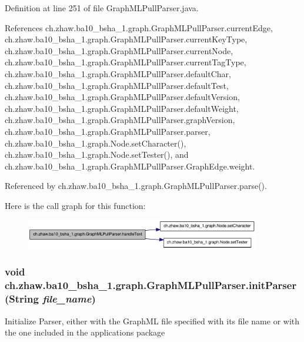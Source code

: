 Definition at line 251 of file GraphMLPullParser.java.

References ch.zhaw.ba10\_\-bsha\_\-1.graph.GraphMLPullParser.currentEdge, ch.zhaw.ba10\_\-bsha\_\-1.graph.GraphMLPullParser.currentKeyType, ch.zhaw.ba10\_\-bsha\_\-1.graph.GraphMLPullParser.currentNode, ch.zhaw.ba10\_\-bsha\_\-1.graph.GraphMLPullParser.currentTagType, ch.zhaw.ba10\_\-bsha\_\-1.graph.GraphMLPullParser.defaultChar, ch.zhaw.ba10\_\-bsha\_\-1.graph.GraphMLPullParser.defaultTest, ch.zhaw.ba10\_\-bsha\_\-1.graph.GraphMLPullParser.defaultVersion, ch.zhaw.ba10\_\-bsha\_\-1.graph.GraphMLPullParser.defaultWeight, ch.zhaw.ba10\_\-bsha\_\-1.graph.GraphMLPullParser.graphVersion, ch.zhaw.ba10\_\-bsha\_\-1.graph.GraphMLPullParser.parser, ch.zhaw.ba10\_\-bsha\_\-1.graph.Node.setCharacter(), ch.zhaw.ba10\_\-bsha\_\-1.graph.Node.setTester(), and ch.zhaw.ba10\_\-bsha\_\-1.graph.GraphMLPullParser.GraphEdge.weight.

Referenced by ch.zhaw.ba10\_\-bsha\_\-1.graph.GraphMLPullParser.parse().

Here is the call graph for this function:\nopagebreak
\begin{figure}[H]
\begin{center}
\leavevmode
\includegraphics[width=290pt]{classch_1_1zhaw_1_1ba10__bsha__1_1_1graph_1_1GraphMLPullParser_a06f1ee797fdd3fe07b3665cbaf3413d9_cgraph}
\end{center}
\end{figure}
\hypertarget{classch_1_1zhaw_1_1ba10__bsha__1_1_1graph_1_1GraphMLPullParser_adbe40e63ba94ad70d3dfc64b37c098b8}{
\subsubsection[{initParser}]{\setlength{\rightskip}{0pt plus 5cm}void ch.zhaw.ba10\_\-bsha\_\-1.graph.GraphMLPullParser.initParser (String {\em file\_\-name})}}
\label{classch_1_1zhaw_1_1ba10__bsha__1_1_1graph_1_1GraphMLPullParser_adbe40e63ba94ad70d3dfc64b37c098b8}
Initialize Parser, either with the GraphML file specified with its file name or with the one included in the applications package



